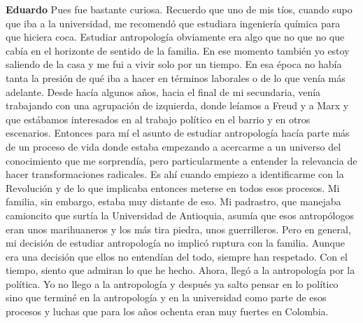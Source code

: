 \documentclass[
  spanish,
  11pt,
  a4paper,
]{scrbook}
\newenvironment{transcripcion}{
    \begin{list}{}{
        \setlength{\leftmargin}{1.5em}  %
        \setlength{\rightmargin}{0em}
        \setlength{\itemsep}{0.2em}     %
        \setlength{\parsep}{0.0em}
        \setlength{\listparindent}{0pt}
    }
}{
    \end{list}
}
\newcommand{\personaje}[1]{\textbf{#1}\quad}
\begin{document}
\begin{transcripcion}
\item \personaje{Eduardo} Pues fue bastante curiosa. Recuerdo que uno de mis tíos, cuando supo que iba a la universidad, me recomendó que estudiara ingeniería química para que hiciera coca. Estudiar antropología obviamente era algo que no que no que cabía en el horizonte de sentido de la familia. En ese momento también yo estoy saliendo de la casa y me fui a vivir solo por un tiempo. En esa época no había tanta la presión de qué iba a hacer en términos laborales o de lo que venía más adelante. Desde hacía algunos años, hacia el final de mi secundaria, venía trabajando con una agrupación de izquierda, donde leíamos a Freud y a Marx y que estábamos interesados en al trabajo político en el barrio y en otros escenarios. Entonces para mí el asunto de estudiar antropología hacía parte más de un proceso de vida donde estaba empezando a acercarme a un universo del conocimiento que me sorprendía, pero particularmente a entender la relevancia de hacer transformaciones radicales. Es ahí cuando empiezo a identificarme con la Revolución y de lo que implicaba entonces meterse en todos esos procesos. Mi familia, sin embargo, estaba muy distante de eso. Mi padrastro, que manejaba camioncito que surtía la Universidad de Antioquia, asumía que esos antropólogos eran unos marihuaneros y los más tira piedra, unos guerrilleros. Pero en general, mi decisión de estudiar antropología no implicó ruptura con la familia. Aunque era una decisión que ellos no entendían del todo, siempre han respetado. Con el tiempo, siento que admiran lo que he hecho. Ahora, llegó a la antropología por la política. Yo no llego a la antropología y después ya salto pensar en lo político sino que terminé en la antropología y en la universidad como parte de esos procesos y luchas que para los años ochenta eran muy fuertes en Colombia.


\end{transcripcion}
\end{document}
